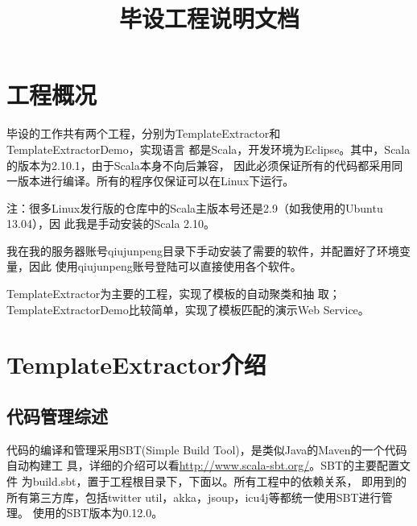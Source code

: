 \documentclass{article}
\title{毕设工程说明文档}
\author{\qjp}
\date{}
\begin{document}
\maketitle
\section{工程概况}
毕设的工作共有两个工程，分别为TemplateExtractor和TemplateExtractorDemo，实现语言
都是Scala，开发环境为Eclipse。其中，Scala的版本为2.10.1，由于Scala本身不向后兼容，
因此必须保证所有的代码都采用同一版本进行编译。所有的程序仅保证可以在Linux下运行。

注：很多Linux发行版的仓库中的Scala主版本号还是2.9（如我使用的Ubuntu 13.04），因
此我是手动安装的Scala 2.10。

我在我的服务器账号qiujunpeng目录下手动安装了需要的软件，并配置好了环境变量，因此
使用qiujunpeng账号登陆可以直接使用各个软件。

TemplateExtractor为主要的工程，实现了模板的自动聚类和抽
取；TemplateExtractorDemo比较简单，实现了模板匹配的演示Web Service。
\section{TemplateExtractor介绍}
\label{sec:templateextractor}
\subsection{代码管理综述}
\newcommand*{\prj}{PROJECT\_DIR}
代码的编译和管理采用SBT(Simple Build Tool)，是类似Java的Maven的一个代码自动构建工
具，详细的介绍可以看\url{http://www.scala-sbt.org/}。SBT的主要配置文件
为build.sbt，置于工程根目录下，下面以。所有工程中的依赖关系，
即用到的所有第三方库，包括twitter util，akka，jsoup，icu4j等都统一使用SBT进行管理。
使用的SBT版本为0.12.0。
\end{document}

